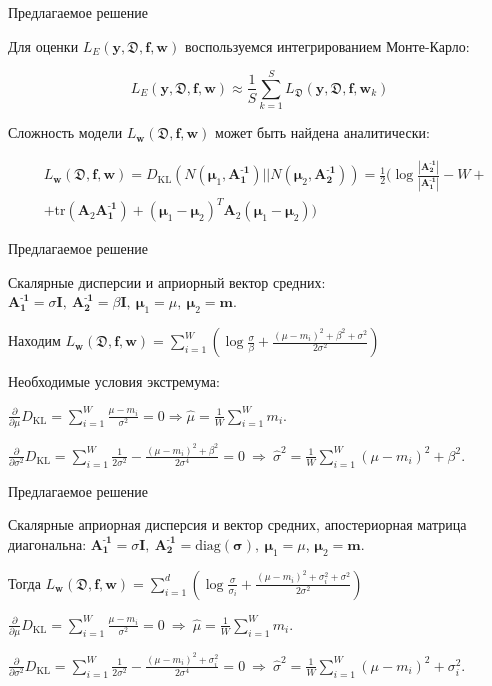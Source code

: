 \documentclass{beamer}
\newcommand{\DD}{{\mathfrak{D}}}
\newcommand{\bw}{{\textbf{w}}}
\newcommand{\II}{{\textbf{I}}}
\newcommand{\bbf}{{\textbf{f}}}
\newcommand{\by}{{\textbf{y}}}
\newcommand{\bm}{{\textbf{m}}}
\newcommand{\bs}{{\boldsymbol{\sigma}}}
\newcommand{\bAo}{\mathbf{A^\text{-1}_\text{1}}}
\newcommand{\bAt}{\mathbf{A^\text{-1}_\text{2}}}
\newcommand{\bmuo}{{\boldsymbol{\mu}_1}}
\newcommand{\bmut}{{\boldsymbol{\mu}_2}}
\newcommand{\DKL}{\mathit{D}_{\text{KL}}}
\begin{document}
\begin{frame}{Предлагаемое решение}

Для оценки $L_E(\by,\DD,\bbf,\bw)$ воспользуемся интегрированием Монте-Карло:

$$L_E(\by,\DD,\bbf,\bw) \approx \frac1S\sum\limits_{k=1}^S L_\DD(\by,\DD, \bbf,\bw_k)$$

Сложность модели $L_\bw(\DD,\bbf,\bw)$ может быть найдена аналитически:

\begin{align*}
&L_\bw(\DD,\bbf,\bw) = \DKL(N(\bmuo,\bAo)||N(\bmut,\bAt)) = \frac12 \big( \log \frac{|\bAt|}{|\bAo|}-W+\\
&+\text{tr}(\textbf{A}_2\bAo)+(\bmuo-\bmut)^T\textbf{A}_2(\bmuo-\bmut) \big) 
\end{align*}

\end{frame}

\begin{frame}{Предлагаемое решение}

Скалярные дисперсии и априорный вектор средних: $\bAo = \sigma\II , \ \bAt = \beta \II , \ \bmuo = \mu, \ \bmut = \bm$.

Находим $L_\bw(\DD,\bbf,\bw) = \sum\limits_{i=1}^W(\log\frac{\sigma}{\beta} + \frac{(\mu-m_i)^2 + \beta^2 + \sigma^2}{2\sigma^2})$

Необходимые условия экстремума:

$\frac\partial{\partial\mu}\DKL = \sum\limits_{i=1}^W\frac{\mu-m_i}{\sigma^2}=0 \Rightarrow \hat{\mu} = \frac1W\sum\limits_{i=1}^W m_i$.

$\frac\partial{\partial\sigma^2}\DKL = \sum\limits_{i=1}^W \frac1{2\sigma^2}-\frac{(\mu-m_i)^2 + \beta^2}{2\sigma^4}=0 \ \Rightarrow \ \hat{\sigma}^2 = \frac1W\sum\limits_{i=1}^W (\mu-m_i)^2 + \beta^2$.


\end{frame}

\begin{frame}{Предлагаемое решение}

Скалярные априорная дисперсия и вектор средних, апостериорная матрица диагональна: $\bAo = \sigma\II, \ \bAt = \text{diag}(\bs), \ \bmuo = \mu$, $\bmut = \bm$.

Тогда $L_\bw(\DD,\bbf,\bw) = \sum\limits_{i=1}^d(\log\frac{\sigma}{\sigma_i} + \frac{(\mu-m_i)^2 + \sigma_i^2 + \sigma^2}{2\sigma^2})$

$\frac\partial{\partial\mu}\DKL = \sum\limits_{i=1}^W\frac{\mu-m_i}{\sigma^2}=0 \ \Rightarrow \ \hat{\mu} = \frac1W\sum\limits_{i=1}^W m_i$.

$\frac\partial{\partial\sigma^2}\DKL = \sum\limits_{i=1}^W \frac1{2\sigma^2}-\frac{(\mu-m_i)^2 + \sigma_i^2}{2\sigma^4}=0 \ \Rightarrow \ \hat{\sigma}^2 = \frac1W\sum\limits_{i=1}^W (\mu-m_i)^2 + \sigma_i^2$.

\end{frame}
\end{document}
